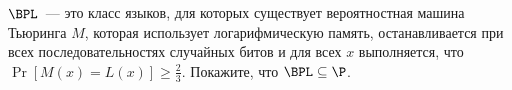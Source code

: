 $\BPL$~--- это класс языков, для которых существует вероятностная машина Тьюринга $M$, которая использует логарифмическую
память, останавливается при всех последовательностях случайных битов и для всех $x$ выполняется, что $\Pr[M(x) = L(x)] \ge
\frac{2}{3}$. Покажите, что $\BPL \subseteq \P$.